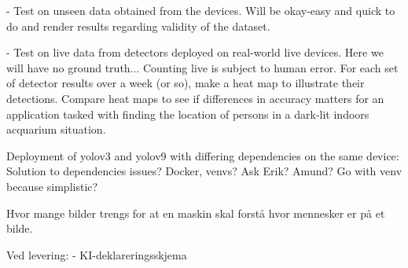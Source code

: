 - Test on unseen data obtained from the devices.
	Will be okay-easy and quick to do and render results regarding validity of the dataset.

- Test on live data from detectors deployed on real-world live devices.
	Here we will have no ground truth... Counting live is subject to human error. 
	For each set of detector results over a week (or so), make a heat map to illustrate their detections. 
	Compare heat maps to see if differences in accuracy matters for an application tasked with finding the location of persons in a dark-lit indoors acquarium situation.

	Deployment of yolov3 and yolov9 with differing dependencies on the same device:
	Solution to dependencies issues? Docker, venvs?	Ask Erik? Amund? Go with venv because simplistic?

Hvor mange bilder trengs for at en maskin skal forstå hvor mennesker er på et bilde.



Ved levering:
- KI-deklareringsskjema